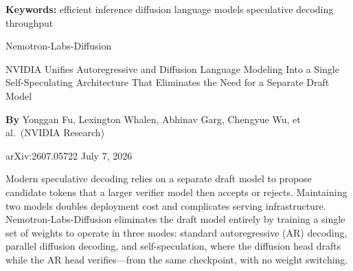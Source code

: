 \documentclass[10pt,twocolumn]{article}
\begin{document}
\setlength{\parindent}{0pt}
\setlength{\parskip}{4pt}

{\small\color{keywordgray}\textbf{Keywords:}
  efficient inference \textbullet{}
  diffusion language models \textbullet{}
  speculative decoding \textbullet{}
  throughput}\par\vspace{4pt}

{\LARGE\bfseries\raggedright
  Nemotron-Labs-Diffusion}\par\vspace{4pt}

{\large\itshape\raggedright
  NVIDIA Unifies Autoregressive and Diffusion Language Modeling
  Into a Single Self-Speculating Architecture That Eliminates the
  Need for a Separate Draft Model}\par\vspace{6pt}

{\small\textbf{By} Yonggan Fu, Lexington Whalen, Abhinav Garg,
  Chengyue Wu, et al.\ (NVIDIA Research)}\par\vspace{2pt}

{\small\color{keywordgray}arXiv:2607.05722 \textbullet{}
  July 7, 2026}
\par\vspace{2pt}\noindent{\color{rulered}\rule{\columnwidth}{0.6pt}}\vspace{6pt}

Modern speculative decoding relies on a separate draft model to propose
candidate tokens that a larger verifier model then accepts or rejects.
Maintaining two models doubles deployment cost and complicates serving
infrastructure. Nemotron-Labs-Diffusion eliminates the draft model
entirely by training a single set of weights to operate in three modes:
standard autoregressive (AR) decoding, parallel diffusion decoding, and
self-speculation, where the diffusion head drafts while the AR head
verifies---from the same checkpoint, with no weight switching.
\end{document}
